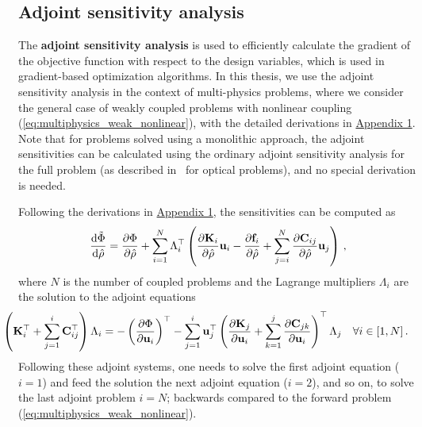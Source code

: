     \subsection*{Adjoint sensitivity analysis}

    The \textbf{adjoint sensitivity analysis} is used to efficiently calculate the gradient
    of the objective function with
    respect to the design variables, which is used in gradient-based optimization algorithms. 
    In this thesis, we use the adjoint sensitivity
    analysis  in the context of
    multi-physics problems, where we consider the general case of weakly coupled problems with
    nonlinear coupling (\eqref{eq:multiphysics_weak_nonlinear}), with the detailed derivations in 
    \hyperref[app:appendix1]{Appendix 1}. Note that for problems 
    solved using a monolithic approach, the adjoint sensitivities can be calculated using the
    ordinary adjoint sensitivity analysis for the full problem (as described in~\cite{jensen_review} for optical problems), and no special derivation is needed.

    Following the derivations in \hyperref[app:appendix1]{Appendix 1}, the sensitivities can be computed as
    \begin{equation}
        \frac{\mathop{}\!\text{d} \tilde{\Phi}}{\mathop{}\!\text{d} \hat{\rho}}  = \frac{\partial \Phi}{\partial \hat{\rho}} + \sum^N_{i=1} \Lambda_{i}^{\top} \left( \frac{\partial \mathbf{K}_i}{\partial \hat{\rho}} \mathbf{u}_i - \frac{\partial \mathbf{f}_i}{\partial \hat{\rho}} + \sum^N_{j=i} \frac{\partial \mathbf{C}_{ij}}{\partial \hat{\rho}} \mathbf{u}_j \right)\,,
    \end{equation}
    where $N$ is the number of coupled problems and the Lagrange multipliers $\Lambda_i$ are the solution to the adjoint equations
    \begin{equation}
        \hspace*{-0.775cm}\left( \mathbf{K}^\top_i + \sum^i_{j=1} \mathbf{C}^\top_{ij} \right) \Lambda_i = -\left(\frac{\partial \Phi}{\partial \mathbf{u}_i}\right)^\top - \sum_{j=1}^{i} \mathbf{u}^\top_j 
        \left(\frac{\partial \mathbf{K}_j}{\partial \mathbf{u}_i} + \sum^{j}_{k=1} \frac{\partial \mathbf{C}_{jk}}{\partial \mathbf{u}_i} \right)^\top \Lambda_j  \quad \forall i \in [1, N] \,.
    \end{equation}
    Following these adjoint systems, one needs to solve the first adjoint equation ($i=1$) 
    and feed the solution the next adjoint equation ($i=2$), and so on, to solve the last adjoint problem $i=N$; backwards compared to the forward problem (\eqref{eq:multiphysics_weak_nonlinear}).

